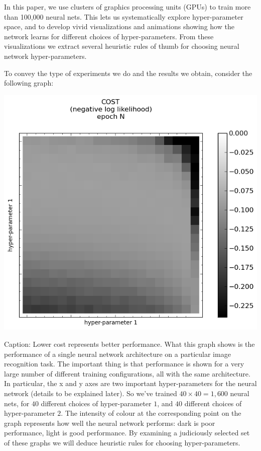 \documentclass[10pt]{article}
\begin{document}
%
%
In this paper, we use clusters of graphics processing units (GPUs) to
train more than 100,000 neural nets.  This lets us systematically
explore hyper-parameter space, and to develop vivid visualizations and
animations showing how the network learns for different choices of
hyper-parameters.  From these visualizations we extract several
heuristic rules of thumb for choosing neural network hyper-parameters.

%
%
To convey the type of experiments we do and the results we obtain,
consider the following graph:
%
\begin{center}
\includegraphics[scale=0.8]{plots/example.png}
\end{center}


Caption: Lower cost represents better performance.
%
What this graph shows is the performance of a single neural network
architecture on a particular image recognition task.  The important
thing is that performance is shown for a very large number of
different training configurations, all with the same architecture.  In
particular, the x and y axes are two important hyper-parameters for
the neural network (details to be explained later).  So we've trained
$40 \times 40 = 1,600$ neural nets, for $40$ different choices of
hyper-parameter $1$, and $40$ different choices of hyper-parameter
$2$.  The intensity of colour at the corresponding point on the graph
represents how well the neural network performs: dark is poor
performance, light is good performance.  By examining a judiciously
selected set of these graphs we will deduce heuristic rules for
choosing hyper-parameters.
\end{document}
